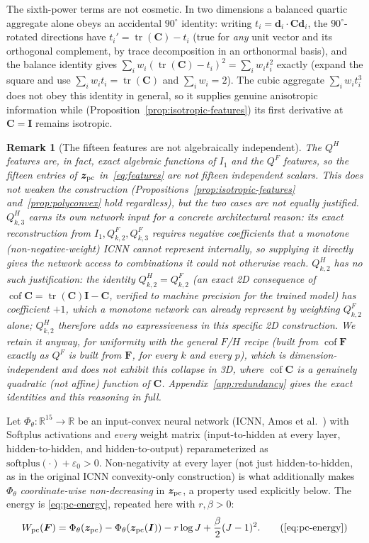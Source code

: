 \documentclass[10pt,a4paper]{article}
\newtheorem{remark}{Remark}
\newcommand{\Cof}{\operatorname{cof}}
\newcommand{\tr}{\operatorname{tr}}
\newcommand{\R}{\mathbb{R}}
\begin{document}
The sixth-power terms are not cosmetic. In two dimensions a balanced
quartic aggregate alone obeys an accidental $90^\circ$ identity: writing
$t_i=\bm d_i\cdot \bm C\bm d_i$, the $90^\circ$-rotated directions have $t_i'=\tr(\bm C)-t_i$
(true for \emph{any} unit vector and its orthogonal complement, by trace
decomposition in an orthonormal basis), and the balance identity gives
$\sum_iw_i(\tr(\bm C)-t_i)^2=\sum_iw_it_i^2$ exactly (expand the square and
use $\sum_iw_it_i=\tr(\bm C)$ and $\sum_iw_i=2$). The cubic aggregate
$\sum_iw_it_i^3$ does not obey this identity in general, so it supplies
genuine anisotropic information while (Proposition~\ref{prop:isotropic-features})
its first derivative at $\bm C=\bm I$ remains isotropic.

\begin{remark}[The fifteen features are not algebraically independent]
\label{rem:redundancy}
The $Q^H$ features are, in fact, exact algebraic functions of $I_1$ and
the $Q^F$ features, so the fifteen entries of $\bm z_{\rm pc}$
in~\eqref{eq:features} are not fifteen independent scalars. This does
not weaken the construction (Propositions~\ref{prop:isotropic-features}
and~\ref{prop:polyconvex} hold regardless), but the two cases are not
equally justified. $Q_{k,3}^H$ earns its own network input for a
concrete architectural reason: its exact reconstruction from
$I_1,Q_{k,2}^F,Q_{k,3}^F$ requires negative coefficients that a
monotone (non-negative-weight) ICNN cannot represent internally, so
supplying it directly gives the network access to combinations it
could not otherwise reach. $Q_{k,2}^H$ has no such justification: the
identity $Q_{k,2}^H=Q_{k,2}^F$ (an exact 2D consequence of
$\Cof\bm C=\tr(\bm C)\bm I-\bm C$, verified to machine precision for
the trained model) has coefficient $+1$, which a monotone network
can already represent by weighting $Q_{k,2}^F$ alone; $Q_{k,2}^H$
therefore adds no expressiveness in this specific 2D construction. We
retain it anyway, for uniformity with the general $F$/$H$ recipe
(built from $\Cof\bm F$ exactly as $Q^F$ is built from $\bm F$, for
every $k$ and every $p$), which is dimension-independent and does not
exhibit this collapse in 3D, where $\Cof\bm C$ is a genuinely
quadratic (not affine) function of $\bm C$. Appendix~\ref{app:redundancy}
gives the exact identities and this reasoning in full.
\end{remark}

Let $\Phi_\theta:\R^{15}\to\R$ be an input-convex neural network (ICNN,
Amos et al.~\cite{Amos2017}) with Softplus activations and \emph{every}
weight matrix (input-to-hidden at every layer, hidden-to-hidden, and
hidden-to-output) reparameterized as $\mathrm{softplus}(\cdot)+
\varepsilon_0>0$. Non-negativity at every layer (not just hidden-to-hidden,
as in the original ICNN convexity-only construction) is what additionally
makes $\Phi_\theta$ \emph{coordinate-wise non-decreasing} in $\bm
z_{\rm pc}$, a property used explicitly below. The energy is
\eqref{eq:pc-energy}, repeated here with $r,\beta>0$:
\begin{equation}
 W_{\rm pc}(\bm F)=\Phi_\theta(\bm z_{\rm pc})-\Phi_\theta(\bm z_{\rm pc}(\bm I))
 -r\log J+\frac\beta2(J-1)^2.
 \tag{\ref*{eq:pc-energy}}
\end{equation}
\end{document}
